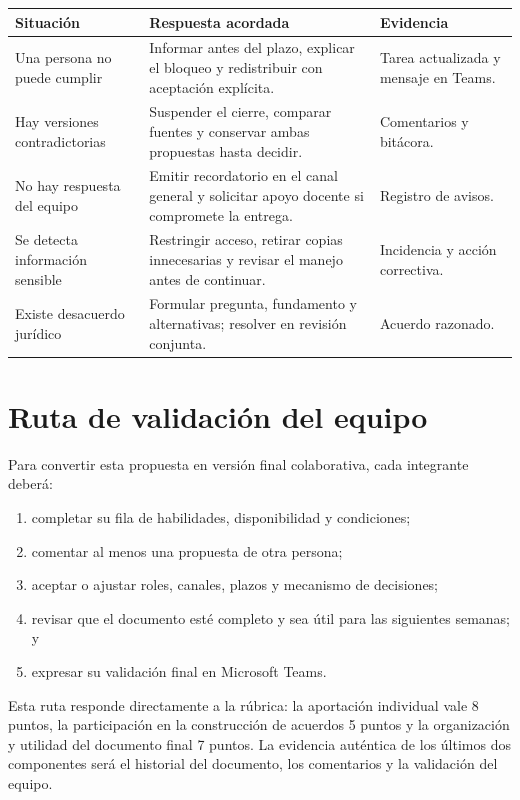 \documentclass[
  spanish,
  letterpaper, oneside
]{article}
\begin{document}
\begin{tabularx}{\textwidth}{p{4cm}X p{3cm}}
\toprule
\textbf{Situación} & \textbf{Respuesta acordada} & \textbf{Evidencia} \\
\midrule
Una persona no puede cumplir & Informar antes del plazo, explicar el bloqueo y redistribuir con aceptación explícita. & Tarea actualizada y mensaje en Teams. \\
Hay versiones contradictorias & Suspender el cierre, comparar fuentes y conservar ambas propuestas hasta decidir. & Comentarios y bitácora. \\
No hay respuesta del equipo & Emitir recordatorio en el canal general y solicitar apoyo docente si compromete la entrega. & Registro de avisos. \\
Se detecta información sensible & Restringir acceso, retirar copias innecesarias y revisar el manejo antes de continuar. & Incidencia y acción correctiva. \\
Existe desacuerdo jurídico & Formular pregunta, fundamento y alternativas; resolver en revisión conjunta. & Acuerdo razonado. \\
\bottomrule
\end{tabularx}

\section{Ruta de validación del equipo}

Para convertir esta propuesta en versión final colaborativa, cada integrante deberá:

\begin{enumerate}
  \item completar su fila de habilidades, disponibilidad y condiciones;
  \item comentar al menos una propuesta de otra persona;
  \item aceptar o ajustar roles, canales, plazos y mecanismo de decisiones;
  \item revisar que el documento esté completo y sea útil para las siguientes semanas; y
  \item expresar su validación final en Microsoft Teams.
\end{enumerate}

Esta ruta responde directamente a la rúbrica: la aportación individual vale 8 puntos,
la participación en la construcción de acuerdos 5 puntos y la organización y utilidad
del documento final 7 puntos. La evidencia auténtica de los últimos dos componentes
será el historial del documento, los comentarios y la validación del equipo.
\end{document}
